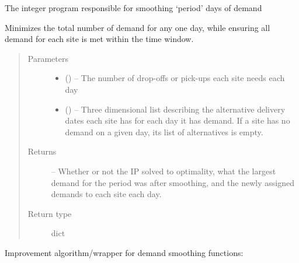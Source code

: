 \documentclass[letterpaper,10pt,english]{sphinxmanual}
\begin{document}
\begin{fulllineitems}
\label{\detokenize{variation:smoothing.smoothing_model}}
The integer program responsible for smoothing `period' days of demand

Minimizes the total number of demand for any one day, while ensuring all
demand for each site is met within the time window.
\begin{quote}\begin{description}
\item[{Parameters}] \leavevmode\begin{itemize}
\item {} 
 () -- The number of drop-offs or pick-ups each site needs each day

\item {} 
 () -- Three dimensional list describing the alternative delivery dates
each site has for each day it has demand. If a site has no demand on
a given day, its list of alternatives is empty.

\end{itemize}

\item[{Returns}] \leavevmode
{} -- Whether or not the IP solved to optimality, what the largest
demand for the period was after smoothing, and the newly assigned
demands to each site each day.

\item[{Return type}] \leavevmode
dict

\end{description}\end{quote}

\end{fulllineitems}


Improvement algorithm/wrapper for demand smoothing functions:
\end{document}
